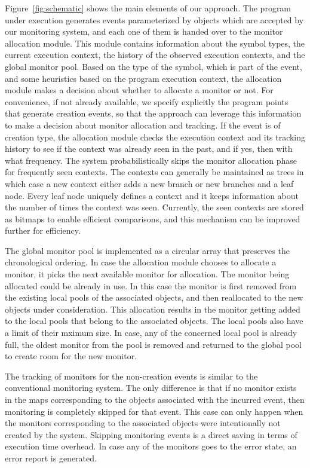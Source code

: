 Figure~\ref{fig:schematic} shows the main elements of our approach. The program 
under execution generates events parameterized by objects which are accepted by 
our monitoring system, and each one of them is handed over to the monitor 
allocation module. This module contains information about the symbol types, the current execution context, 
the history of the observed execution contexts, and the global monitor pool.
Based on the type of the symbol, which is part of the event, and some heuristics 
based on the program execution context, the allocation module makes a decision about whether to allocate a monitor or not.
For convenience, if not already available, we 
specify explicitly the program points that generate creation events, so that the 
approach can leverage this information to make a decision about monitor allocation and tracking. 
If the event is of creation type, the allocation module checks the execution context and its 
tracking history to see if the context was already seen in the past, and if yes, 
then with what frequency. The system probabilistically skips the monitor 
allocation phase for frequently seen contexts. The contexts can generally be maintained as
trees in which case a new context either adds a new branch or new branches and a leaf node. 
Every leaf node uniquely defines a context and it keeps information about the 
number of times the context was seen. Currently, the seen contexts are stored as bitmaps to enable efficient
comparisons, and this mechanism can be improved further for efficiency.

The global monitor pool is implemented as a circular array that preserves 
the chronological ordering. In case the allocation module chooses to allocate a monitor,
it picks the next available monitor for allocation. The monitor being allocated could be already in use.
In this case the monitor is first removed from the existing local pools of the associated 
objects, and then reallocated to the new objects under consideration. This allocation results in the monitor
getting added to the local pools that belong to the associated objects. The local pools also have a limit of their mximum size.
In case, any of the concerned local pool is already full, the oldest monitor from the pool is removed and returned to the global pool
to create room for the new monitor. 

The tracking of monitors for the non-creation events is similar to the 
conventional monitoring system. The only difference is that if no monitor exists in the maps 
corresponding to the objects associated with the incurred event, then monitoring is completely 
skipped for that event. This case can only happen when the monitors corresponding to the 
associated objects were intentionally not created by the system. Skipping monitoring events is a 
direct saving in terms of execution time overhead. In case any of the monitors goes to the error state,
an error report is generated.



